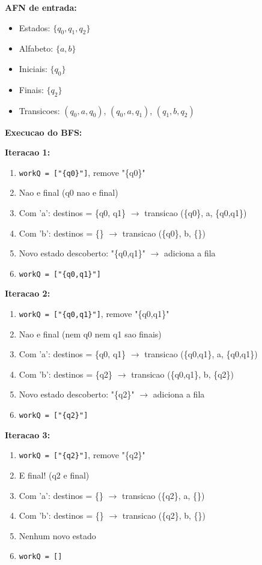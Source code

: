 \documentclass[12pt,a4paper]{article}
\begin{document}
\textbf{AFN de entrada:}
\begin{itemize}
    \item Estados: $\{q_0, q_1, q_2\}$
    \item Alfabeto: $\{a, b\}$
    \item Iniciais: $\{q_0\}$
    \item Finais: $\{q_2\}$
    \item Transicoes: $(q_0, a, q_0)$, $(q_0, a, q_1)$, $(q_1, b, q_2)$
\end{itemize}

\textbf{Execucao do BFS:}

\textbf{Iteracao 1:}
\begin{enumerate}
    \item \texttt{workQ = ["\{q0\}"]}, remove "\{q0\}"
    \item Nao e final (q0 nao e final)
    \item Com 'a': destinos = \{q0, q1\} $\rightarrow$ transicao (\{q0\}, a, \{q0,q1\})
    \item Com 'b': destinos = \{\} $\rightarrow$ transicao (\{q0\}, b, \{\})
    \item Novo estado descoberto: "\{q0,q1\}" $\rightarrow$ adiciona a fila
    \item \texttt{workQ = ["\{q0,q1\}"]}
\end{enumerate}

\textbf{Iteracao 2:}
\begin{enumerate}
    \item \texttt{workQ = ["\{q0,q1\}"]}, remove "\{q0,q1\}"
    \item Nao e final (nem q0 nem q1 sao finais)
    \item Com 'a': destinos = \{q0, q1\} $\rightarrow$ transicao (\{q0,q1\}, a, \{q0,q1\})
    \item Com 'b': destinos = \{q2\} $\rightarrow$ transicao (\{q0,q1\}, b, \{q2\})
    \item Novo estado descoberto: "\{q2\}" $\rightarrow$ adiciona a fila
    \item \texttt{workQ = ["\{q2\}"]}
\end{enumerate}

\textbf{Iteracao 3:}
\begin{enumerate}
    \item \texttt{workQ = ["\{q2\}"]}, remove "\{q2\}"
    \item E final! (q2 e final)
    \item Com 'a': destinos = \{\} $\rightarrow$ transicao (\{q2\}, a, \{\})
    \item Com 'b': destinos = \{\} $\rightarrow$ transicao (\{q2\}, b, \{\})
    \item Nenhum novo estado
    \item \texttt{workQ = []}
\end{enumerate}
\end{document}
